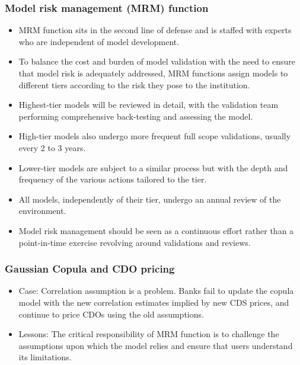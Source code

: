 \subsubsection{Model risk management (MRM) function }
\begin{itemize}
\item MRM function sits in the second line of defense and is staffed with experts who are independent of model development.
\item To balance the cost and burden of model validation with the need to ensure that model risk is adequately addressed, MRM functions assign models to different tiers according to the risk they pose to the institution.
\item Highest-tier models will be reviewed in detail, with the validation team performing comprehensive back-testing and assessing the model.
\item High-tier models also undergo more frequent full scope validations, usually every 2 to 3 years.
\item Lower-tier models are subject to a similar process but with the depth and frequency of the various actions tailored to the tier.
\item All models, independently of their tier, undergo an annual review of the environment.
\item Model risk management should be seen as a continuous effort rather than a point-in-time exercise revolving around validations and reviews.
\end{itemize}




\subsubsection{Gaussian Copula and CDO pricing}
\begin{itemize}
\item Case: Correlation assumption is a problem. Banks fail to update the copula model with the new correlation estimates implied by new CDS prices, and continue to price CDOs using the old assumptions.
\item Lessons: The critical responsibility of MRM function is to challenge the assumptions upon which the model relies and ensure that users understand its limitations.

\end{itemize}




